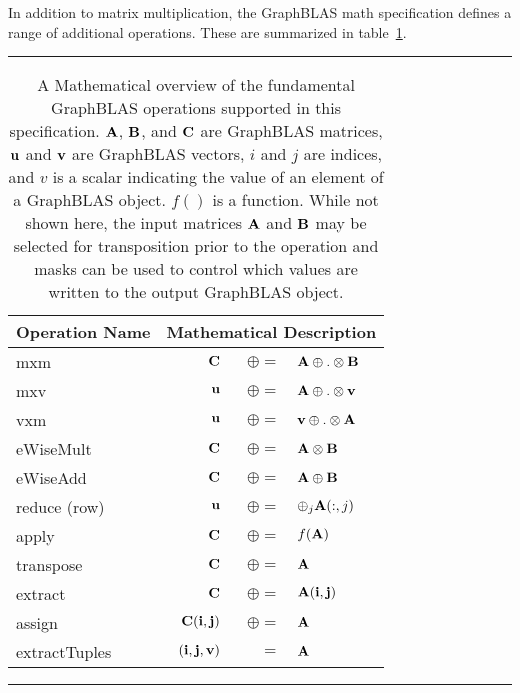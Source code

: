 In addition to matrix multiplication, the GraphBLAS math specification defines
a range of additional operations.  These are summarized in table~\ref{Tab:GraphBLASOps}.

\begin{table}[h]
\hrule
\begin{center}
\caption{A Mathematical overview of the fundamental GraphBLAS operations supported
in this specification. ${\bf A}$, ${\bf B}$, and ${\bf C}$ are GraphBLAS matrices, 
${\bf u}$ and ${\bf v}$ are GraphBLAS vectors, $i$ and $j$ are indices, and $v$ is a scalar 
indicating the value of an element of a GraphBLAS object.  $f()$ is a function.
While not shown here, the input 
matrices ${\bf A}$ and ${\bf B}$ may be selected for transposition prior to 
the operation and masks can be used to control which values are written to the output GraphBLAS object.}
\label{Tab:GraphBLASOps}
\begin{tabular}{l|rrl}
{\sf Operation Name} & \multicolumn{3}{c}{Mathematical Description}  \\
\hline
{\sf mxm}          & ${\bf C}$ & $\oplus=$ & ${\bf A} \oplus.\otimes {\bf B}$  \\
{\sf mxv}          & ${\bf u}$ & $\oplus=$ & ${\bf A} \oplus.\otimes {\bf v}$  \\
{\sf vxm}          & ${\bf u}$ & $\oplus=$ & ${\bf v} \oplus.\otimes {\bf A}$  \\
{\sf eWiseMult}    & ${\bf C}$ & $\oplus=$ & ${\bf A} \otimes {\bf B}$  \\
{\sf eWiseAdd}     & ${\bf C}$ & $\oplus=$ & ${\bf A} \oplus  {\bf B}$  \\
{\sf reduce} (row) & ${\bf u}$ & $\oplus=$ & $\oplus_j{\bf A}(:,j)$  \\
{\sf apply}        & ${\bf C}$ & $\oplus=$ & $f({\bf A})$ \\
{\sf transpose}    & ${\bf C}$ & $\oplus=$ & ${\bf A}$ \\
{\sf extract}      & ${\bf C}$ & $\oplus=$ & ${\bf A}({\bf i},{\bf j})$ \\
{\sf assign}       & ${\bf C}({\bf i},{\bf j})$ & $\oplus=$ & ${\bf A}$ \\
{\sf extractTuples}& $({\bf i},{\bf j},{\bf v})$ & $=$ & ${\bf A}$ \\
\end{tabular}
\end{center}
\hrule
\end{table}

